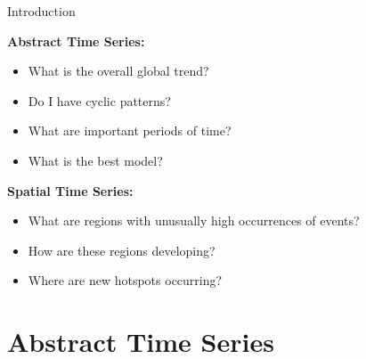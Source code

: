 \documentclass[10pt]{beamer}
\begin{document}
\begin{frame}{Introduction}
	\centering
	\begin{minipage}[t]{0.475\textwidth}
		\textbf{Abstract Time Series:}
		\begin{itemize}
			\item What is the overall global trend?
			\item Do I have cyclic patterns?
			\item What are important periods of time?
			\item What is the best model?
		\end{itemize}
	\end{minipage}
	\hfill
	\begin{minipage}[t]{0.475\textwidth}
		\textbf{Spatial Time Series:}
		\begin{itemize}
			\item What are regions with unusually high occurrences of events?
			\item How are these regions developing? 
			\item Where are new hotspots occurring? 
		\end{itemize}
	\end{minipage}
\end{frame}


\section{Abstract Time Series}

\end{document}
